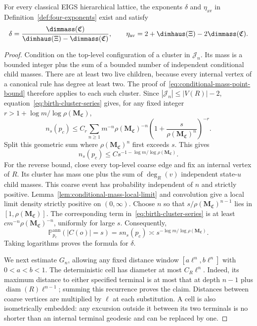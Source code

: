 \begin{theorem}\label{thm:delta-eta-dimensions}
For every classical EIGS hierarchical lattice, the exponents $\delta$ and $\eta_{\mathrm{av}}$ in Definition~\ref{def:four-exponents} exist and satisfy
\[
 \delta=\frac{\dimmass(\mathfrak C)}{\dimhaus(\Xi)-\dimmass(\mathfrak C)},
 \qquad
 \eta_{\mathrm{av}}=2+\dimhaus(\Xi)-2\dimmass(\mathfrak C).
\]
\end{theorem}
\begin{proof}
Condition on the top-level configuration of a cluster in $\mathcal J_n$.
Its mass is a bounded integer plus the sum of a bounded number of independent conditional child masses.
There are at least two live children, because every internal vertex of a canonical rule has degree at least two.
The proof of~\eqref{eq:conditional-mass-point-bound} therefore applies to each such cluster.
Since $|\mathcal J_n|\le |V(R)|-2$, equation~\eqref{eq:birth-cluster-series} gives, for any fixed integer $r>1+\log m/\log\rho(\mathbf M_{\mathfrak C})$,
\[
 n_s(p_c)\le C_r\sum_{n\ge1}
 m^{-n}\rho(\mathbf M_{\mathfrak C})^{-n}
 \left(1+\frac{s}{\rho(\mathbf M_{\mathfrak C})^n}\right)^{-r}.
\]
Split this geometric sum where $\rho(\mathbf M_{\mathfrak C})^n$ first exceeds $s$.
This gives
\[
 n_s(p_c)\le Cs^{-1-\log m/\log\rho(\mathbf M_{\mathfrak C})}.
\]
For the reverse bound, close every top-level coarse edge and fix an internal vertex of $R$.
Its cluster has mass one plus the sum of $\deg_R(v)$ independent state-$u$ child masses.
This coarse event has probability independent of $n$ and strictly positive.
Lemma~\ref{lem:conditional-mass-local-limit} and convolution give a local limit density strictly positive on $(0,\infty)$.
Choose $n$ so that $s/\rho(\mathbf M_{\mathfrak C})^{n-1}$ lies in $[1,\rho(\mathbf M_{\mathfrak C})]$.
The corresponding term in~\eqref{eq:birth-cluster-series} is at least $cm^{-n}\rho(\mathbf M_{\mathfrak C})^{-n}$, uniformly for large $s$.
Consequently,
\begin{equation}\label{eq:annealed-mass-point-law}
 \mathbb P_{p_c}^{\mathrm{ann}}(|C(o)|=s)
 =s n_s(p_c)\asymp s^{-\log m/\log\rho(\mathbf M_{\mathfrak C})}.
\end{equation}
Taking logarithms proves the formula for $\delta$.

We next estimate $G_n$, allowing any fixed distance window $[a\ell^n,b\ell^n]$ with $0<a<b<1$.
The deterministic cell has diameter at most $C_R\ell^n$.
Indeed, its maximum distance to either specified terminal is at most that at depth $n-1$ plus $\operatorname{diam}(R)\ell^{n-1}$; summing this recurrence proves the claim.
Distances between coarse vertices are multiplied by $\ell$ at each substitution.
A cell is also isometrically embedded: any excursion outside it between its two terminals is no shorter than an internal terminal geodesic and can be replaced by one.


\end{proof}
